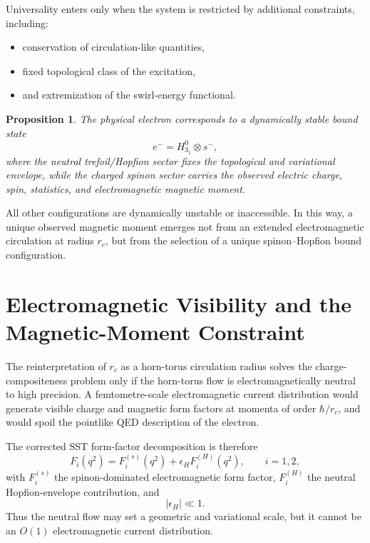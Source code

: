 \documentclass[pdflatex,sn-mathphys-num]{sn-jnl}
\theoremstyle{thmstyleone}
\newtheorem{proposition}{Proposition}
\theoremstyle{thmstyletwo}
\theoremstyle{thmstylethree}
\newcommand{\rc}{r_c}
\newcommand{\Htrefoil}{H^{0}_{3_1}}
\newcommand{\spinon}{s^{-}}
\begin{document}
        Universality enters only when the system is restricted by additional constraints, including:
        \begin{itemize}
            \item conservation of circulation-like quantities,
            \item fixed topological class of the excitation,
            \item and extremization of the swirl-energy functional.
        \end{itemize}

        \begin{proposition}
            The physical electron corresponds to a dynamically stable bound state
            \begin{equation}
                e^- = \Htrefoil \otimes \spinon,
                \label{eq:electron-bound-state}
            \end{equation}
            where the neutral trefoil/Hopfion sector fixes the topological and variational envelope, while the charged spinon sector carries the observed electric charge, spin, statistics, and electromagnetic magnetic moment.
        \end{proposition}

        All other configurations are dynamically unstable or inaccessible. In this way, a unique observed magnetic moment emerges not from an extended electromagnetic circulation at radius $\rc$, but from the selection of a unique spinon--Hopfion bound configuration.

    \section{Electromagnetic Visibility and the Magnetic-Moment Constraint}
        \label{sec:emvisibility}

        The reinterpretation of $\rc$ as a horn-torus circulation radius solves the charge-compositeness problem only if the horn-torus flow is electromagnetically neutral to high precision. A femtometre-scale electromagnetic current distribution would generate visible charge and magnetic form factors at momenta of order $\hbar/\rc$, and would spoil the pointlike QED description of the electron.

        The corrected SST form-factor decomposition is therefore
        \begin{equation}
            F_i(q^2)=F_i^{(s)}(q^2)+\epsilon_H F_i^{(H)}(q^2),
            \qquad i=1,2,
            \label{eq:form-factor-decomposition}
        \end{equation}
        with $F_i^{(s)}$ the spinon-dominated electromagnetic form factor, $F_i^{(H)}$ the neutral Hopfion-envelope contribution, and
        \begin{equation}
            |\epsilon_H|\ll 1.
            \label{eq:epsilon-H-small}
        \end{equation}
        Thus the neutral flow may set a geometric and variational scale, but it cannot be an $O(1)$ electromagnetic current distribution.
\end{document}
